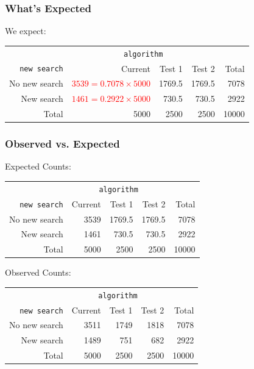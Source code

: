 \documentclass[handout]{beamer}
\newcommand{\red}[1]{\textcolor{red}{#1}}
\begin{document}
\begin{frame}
\frametitle{What's Expected}

We expect:
\begin{center}
  \begin{tabular}{r|rrr|r}
& \multicolumn{3}{c|}{{\tt algorithm}} & \\
       {\tt new search} & Current & Test 1 & Test 2 & Total \\ 
\hline
    No new search & \red{$3539=0.7078 \times 5000$} & 1769.5 & 1769.5 & 7078 \\ 
    New search & \red{$1461=0.2922 \times 5000$} & 730.5 & 730.5 & 2922 \\ 
\hline
    Total & 5000 & 2500 & 2500 & 10000 \\ 
  \end{tabular}
\end{center}

\end{frame}


\begin{frame}
\frametitle{Observed vs. Expected}

Expected Counts:
\begin{center}
  \begin{tabular}{r|rrr|r}
& \multicolumn{3}{c|}{{\tt algorithm}} & \\
       {\tt new search} & Current & Test 1 & Test 2 & Total \\ 
\hline
    No new search & 3539 & 1769.5 & 1769.5 & 7078 \\ 
    New search & 1461 & 730.5 & 730.5 & 2922 \\ 
\hline
    Total & 5000 & 2500 & 2500 & 10000 \\ 
  \end{tabular}
\end{center}
    
\pause Observed Counts:
\begin{center}
  \begin{tabular}{r|rrr|r}
& \multicolumn{3}{c|}{{\tt algorithm}} & \\
       {\tt new search} & Current & Test 1 & Test 2 & Total \\ 
\hline
    No new search & 3511 & 1749 & 1818 & 7078 \\ 
    New search & 1489 & 751 & 682 & 2922 \\ 
\hline
    Total & 5000 & 2500 & 2500 & 10000 \\ 
  \end{tabular}
\end{center}

\end{frame}
\end{document}
